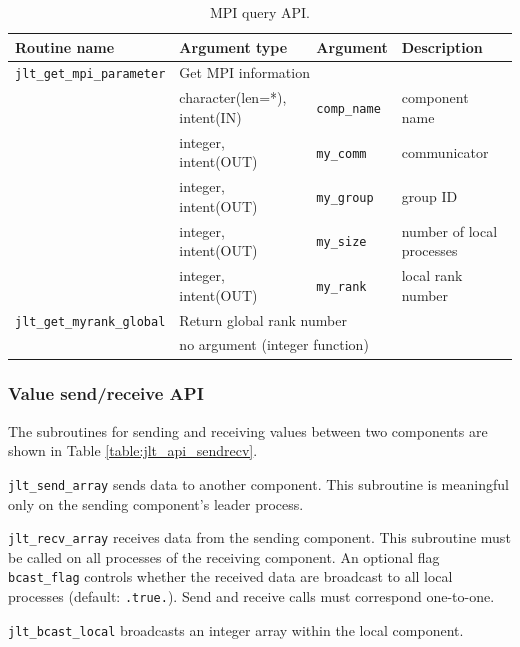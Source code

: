 \documentclass[11pt,a4paper]{report}
\newcommand{\tabref}[1]{Table \ref{#1}}
\begin{document}
\begin{table}[H]
\begin{center}
\caption{MPI query API.}
{\small
\label{table:jlt_api_mpi}
\begin{tabular}{llll}
\hline\hline
Routine name & Argument type & Argument & Description \\
\hline
 \texttt{jlt\_get\_mpi\_parameter} & \multicolumn{3}{l}{Get MPI information} \\
                & character(len=*), intent(IN) & \texttt{comp\_name} & component name\\
                & integer, intent(OUT) & \texttt{my\_comm} & communicator\\
                & integer, intent(OUT) & \texttt{my\_group} & group ID\\
                & integer, intent(OUT) & \texttt{my\_size} & number of local processes\\
                & integer, intent(OUT) & \texttt{my\_rank} & local rank number\\
\hline
 \texttt{jlt\_get\_myrank\_global} & \multicolumn{3}{l}{Return global rank number}\\
                & \multicolumn{3}{l}{no argument (integer function)} \\
\hline\hline
\end{tabular}
}
\end{center}
\end{table}

\subsubsection{Value send/receive API}

The subroutines for sending and receiving values
between two components
are shown in \tabref{table:jlt_api_sendrecv}.

\texttt{jlt\_send\_array} sends data to another component.
This subroutine is meaningful
only on the sending component's leader process.

\texttt{jlt\_recv\_array} receives data
from the sending component.
This subroutine must be called
on all processes of the receiving component.
An optional flag \texttt{bcast\_flag}
controls whether the received data
are broadcast to all local processes
(default: \texttt{.true.}).
Send and receive calls must correspond one-to-one.

\texttt{jlt\_bcast\_local} broadcasts
an integer array within the local component.
\end{document}
